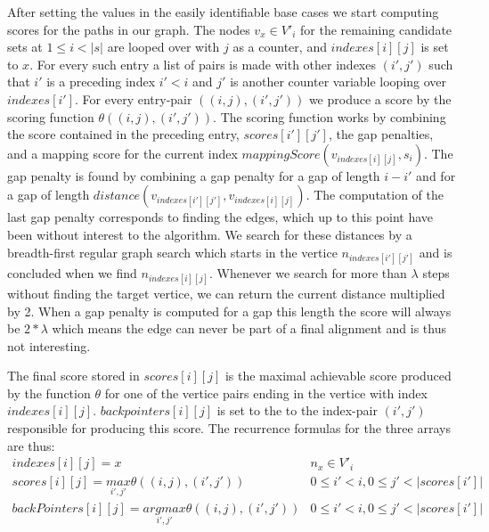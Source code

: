 \documentclass[thesis.tex]{subfiles}
\begin{document}
After setting the values in the easily identifiable base cases we start computing scores for the paths in our graph. The nodes $v_x \in V'_i$ for the remaining candidate sets at $1 \leq i < |s|$ are looped over with $j$ as a counter, and $indexes[i][j]$ is set to $x$. For every such entry a list of pairs is made with other indexes $(i', j')$ such that $i'$ is a preceding index $i'<i$ and $j'$ is another counter variable looping over $indexes[i']$. For every entry-pair $((i, j), (i', j'))$ we produce a score by the scoring function $\theta((i, j), (i', j'))$. The scoring function works by combining the score contained in the preceding entry, $scores[i'][j']$, the gap penalties, and a mapping score for the current index $mappingScore(v_{indexes[i][j]}, s_i)$. The gap penalty is found by combining a gap penalty for a gap of length $i-i'$ and for a gap of length $distance(v_{indexes[i'][j']}, v_{indexes[i][j]})$. The computation of the last gap penalty corresponds to finding the edges, which up to this point have been without interest to the algorithm. We search for these distances by a breadth-first regular graph search which starts in the vertice $n_{indexes[i'][j']}$ and is concluded when we find $n_{indexes[i][j]}$. Whenever we search for more than $\lambda$ steps without finding the target vertice, we can return the current distance multiplied by 2. When a gap penalty is computed for a gap this length the score will always be $2*\lambda$ which means the edge can never be part of a final alignment and is thus not interesting. \\
\par\noindent
The final score stored in $scores[i][j]$ is the maximal achievable score produced by the function $\theta$ for one of the vertice pairs ending in the vertice with index $indexes[i][j]$. $backpointers[i][j]$ is set to the to the index-pair $(i', j')$ responsible for producing this score. The recurrence formulas for the three arrays are thus:\\
\begin{equation}
  \begin{array}{ll}
    indexes[i][j] = x & n_x \in V'_i\\
    scores[i][j] = \underset{i', j'}{max} \theta((i, j), (i', j')) & 0 \leq i' < i, 0 \leq j' < |scores[i']|\\
    backPointers[i][j] = \underset{i', j'}{argmax} \theta((i, j), (i', j')) & 0 \leq i' < i, 0 \leq j' < |scores[i']|\\
  \end{array}
\end{equation}
\end{document}
